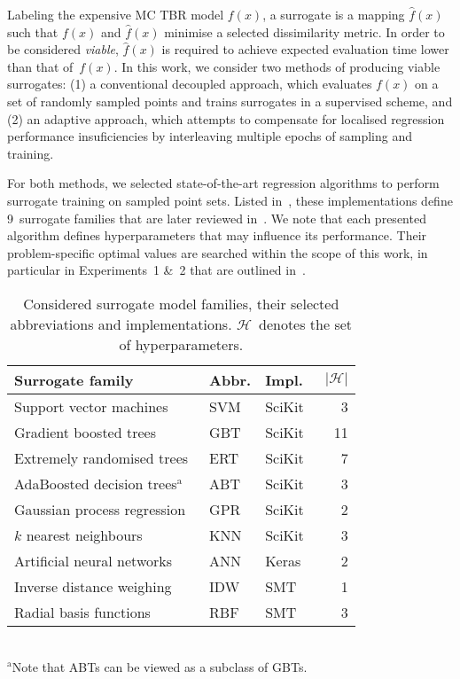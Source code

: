 Labeling the expensive MC TBR model $f(x)$, a surrogate is a mapping
$\hat{f}(x)$ such that $f(x)$ and $\hat{f}(x)$ minimise a selected dissimilarity
metric. In order to be considered \textit{viable}, $\hat{f}(x)$ is required to
achieve expected evaluation time lower than that of~$f(x)$. In this work, we
consider two methods of producing viable surrogates: (1) a conventional decoupled
approach, which evaluates $f(x)$ on a set of randomly sampled points and
trains surrogates in a supervised scheme, and (2) an adaptive approach, which attempts to
compensate for localised regression performance insuficiencies by interleaving
multiple epochs of sampling and training.

For both methods, we selected state-of-the-art regression algorithms to perform
surrogate training on sampled point sets. Listed in~, these
implementations define 9~surrogate families that are later reviewed in~.
We note that each presented algorithm defines hyperparameters that may influence its
performance. Their problem-specific optimal values are searched within the scope
of this work, in particular in Experiments~1 \&~2 that are outlined
in~.

\begin{table}[t]
	\setlength\tabcolsep{2pt}
	\renewcommand{\arraystretch}{0.95}
	\caption{\label{tbl:surrogates}Considered surrogate model families, their
		selected abbreviations and implementations. $\mathcal{H}$~denotes the
		set of hyperparameters.}
	\begin{indented}
	\item[]
		\begin{tabular}{lllr}
		\toprule
		Surrogate family & Abbr. & Impl. & $|\mathcal{H}|$ \\
		\midrule
		Support vector machines~\cite{fan2008liblinear}	& SVM & SciKit~\cite{scikit-learn} & 3 \\
		Gradient boosted trees~\cite{friedman2001greedy,friedman1999stochastic,hastie2009elements}	& GBT & SciKit & 11 \\
		Extremely randomised trees~\cite{geurts2006extremely}	& ERT & SciKit & 7 \\
		AdaBoosted decision trees$^\text{a}$~\cite{drucker1997improving}	& ABT & SciKit & 3 \\
		Gaussian process regression~\cite{williams2006gaussian}	& GPR & SciKit & 2 \\
		$k$ nearest neighbours	& KNN & SciKit & 3 \\
		Artificial neural networks	& ANN & Keras~\cite{chollet2015keras} & 2 \\
		Inverse distance weighing~\cite{shepard1968two} & IDW & SMT~\cite{SMT2019} & 1 \\
		Radial basis functions & RBF & SMT & 3 \\
		\bottomrule
		\end{tabular}\\%
		{\footnotesize $^\text{a}$Note that ABTs can be viewed as a subclass of GBTs.}
	\end{indented}
\end{table}

